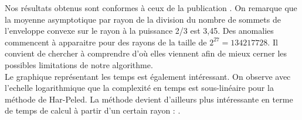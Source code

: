 Nos résultats obtenus sont conformes à ceux de la publication \cite{HarPeled98}. On remarque que la moyenne asymptotique par rayon de la division du nombre de sommets de l'enveloppe convexe sur le rayon à la puissance 2/3 est 3,45. Des anomalies commencent à apparaitre pour des rayons de la taille de $2^{27} = 134217728$. Il convient de chercher à comprendre d'où elles viennent afin de mieux cerner les possibles limitations de notre algorithme.\\

Le graphique représentant les temps est également intéressant. On observe avec l'echelle logarithmique que la complexité en temps est sous-linéaire pour la méthode de Har-Peled. La méthode devient d'ailleurs plus intéressante en terme de temps de calcul à partir d'un certain rayon : .




